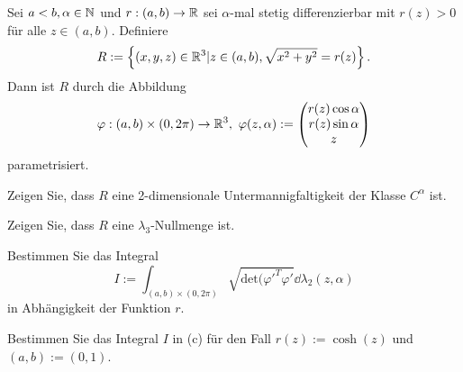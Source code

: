 \begin{Problem}
	Sei $a<b,\alpha\in \mathbb{N}$ und $r:(a,b)\to \mathbb{R}$ sei $\alpha$-mal stetig differenzierbar mit $r(z)>0$ f\"{u}r alle $z\in (a,b)$. Definiere
	\[
	R:=\left\{ (x,y,z)\in \mathbb{R}^3|z\in (a,b), \sqrt{x^2+y^2} =r(z) \right\} 
	.\] 
	Dann ist $R$ durch die Abbildung
	\[
	\varphi:(a,b)\times (0,2\pi)\to \mathbb{R}^3,~\varphi(z,\alpha):=\begin{pmatrix} r(z)\cos\alpha \\ r(z)\sin\alpha \\ z \end{pmatrix} 
\]
parametrisiert.
\begin{parts}
\item Zeigen Sie, dass $R$ eine 2-dimensionale Untermannigfaltigkeit der Klasse $C^\alpha$ ist.
\item Zeigen Sie, dass $R$ eine $\lambda_3$-Nullmenge ist.
\item Bestimmen Sie das Integral
	\[
		I:=\int_{(a,b)\times (0,2\pi)} \sqrt{\text{det}(\varphi'^T\varphi'} \dd{\lambda_2(z,\alpha)}
	\]
	in Abhängigkeit der Funktion $r$.
\item Bestimmen Sie das Integral $I$ in (c) f\"{u}r den Fall $r(z):=\cosh(z)$ und $(a,b):=(0,1)$.
\end{parts}
\end{Problem}
